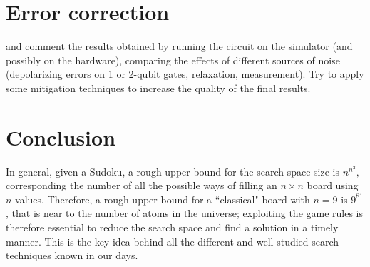 \documentclass{article}
\begin{document}
\section{Error correction}
and comment the results obtained by running the circuit on the simulator (and
possibly on the hardware), comparing the effects of different sources of noise
(depolarizing errors on 1 or 2-qubit gates, relaxation, measurement). Try to
apply
some mitigation techniques to increase the quality of the final results.

\section{Conclusion}
In general, given a Sudoku, a rough upper bound for the search
space size is $n^{n^2},$ corresponding the number of all the possible ways
of filling an $n \times n$ board using $n$ values.
Therefore, a rough upper bound for a ``classical" board with $n=9$ is $9^{81}$,
that is near to the number of atoms in the universe;
exploiting the game rules is therefore essential to reduce the search space
and find a solution in a timely manner. This is the key idea behind all the
different and well-studied search techniques known in our days.
\end{document}
